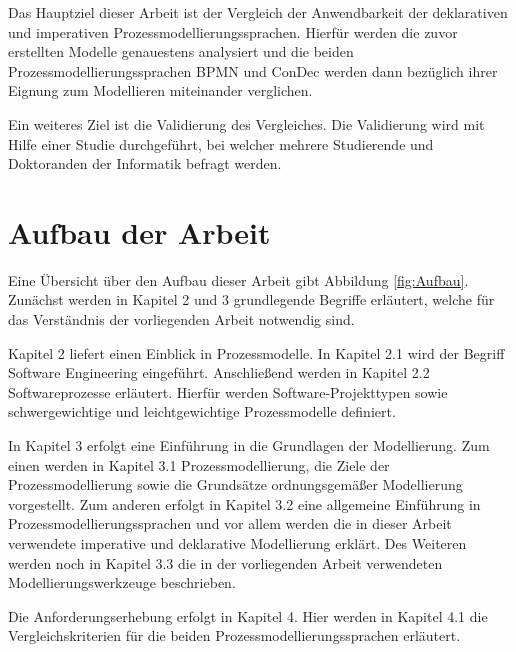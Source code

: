 Das Hauptziel dieser Arbeit ist der Vergleich der Anwendbarkeit der deklarativen und imperativen Prozessmodellierungssprachen. Hierfür werden die zuvor erstellten Modelle genauestens analysiert und die beiden Prozessmodellierungssprachen BPMN und ConDec werden dann bezüglich ihrer Eignung zum Modellieren miteinander verglichen.\newline

Ein weiteres Ziel ist die Validierung des Vergleiches. Die Validierung wird mit Hilfe einer Studie durchgeführt, bei welcher mehrere Studierende und Doktoranden der Informatik befragt werden.\newline





\section{Aufbau der Arbeit}

Eine Übersicht über den Aufbau dieser Arbeit gibt Abbildung \ref{fig:Aufbau}.
Zunächst werden in Kapitel 2 und 3 grundlegende Begriffe erläutert, welche für das Verständnis der vorliegenden Arbeit notwendig sind.\newline

Kapitel 2 liefert einen Einblick in Prozessmodelle. In Kapitel 2.1 wird der Begriff Software Engineering eingeführt. Anschließend werden in Kapitel 2.2 Softwareprozesse erläutert. Hierfür werden Software-Projekttypen sowie schwergewichtige und leichtgewichtige Prozessmodelle definiert.\newline

In Kapitel 3 erfolgt eine Einführung in die Grundlagen der Modellierung. Zum einen werden in Kapitel 3.1 Prozessmodellierung, die Ziele der Prozessmodellierung sowie die Grundsätze ordnungsgemäßer Modellierung vorgestellt. Zum anderen erfolgt in Kapitel 3.2 eine allgemeine Einführung in Prozessmodellierungssprachen und vor allem werden die in dieser Arbeit verwendete imperative und deklarative Modellierung erklärt. Des Weiteren werden noch in Kapitel 3.3 die in der vorliegenden Arbeit verwendeten Modellierungswerkzeuge beschrieben.\newline

Die Anforderungserhebung erfolgt in Kapitel 4. Hier werden in Kapitel 4.1 die Vergleichskriterien für die beiden Prozessmodellierungssprachen erläutert.\newline

